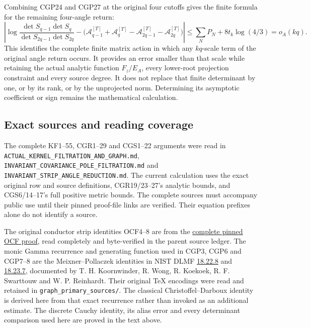 \documentclass[11pt]{article}
\begin{document}
Combining CGP24 and CGP27 at the original four cutoffs gives the finite formula for the remaining four-angle return: \[
\boxed{\left|
\log\frac{\det S_{q-1}\det S_q}{\det S_{2q-1}\det S_{2q}}
-\bigl(\mathcal A_{q-1}^{[T]}+\mathcal A_q^{[T]}
-\mathcal A_{2q-1}^{[T]}-\mathcal A_{2q}^{[T]}\bigr)
\right|
\le\sum_NP_N+8t_k\log(4/3)=o_A(kq).}
\tag{CGP28}
\] This identifies the complete finite matrix action in which any \(kq\)-scale term of the original angle return occurs. It provides an error smaller than that scale while retaining the actual analytic function \(F_z/E_A\), every lower-root projection constraint and every source degree. It does not replace that finite determinant by one, or by its rank, or by the unprojected norm. Determining its asymptotic coefficient or sign remains the mathematical calculation.

\subsection{Exact sources and reading coverage}\label{exact-sources-and-reading-coverage}

The complete KF1--55, CGR1--29 and CGS1--22 arguments were read in \nolinkurl{ACTUAL_KERNEL_FILTRATION_AND_GRAPH.md}, \nolinkurl{INVARIANT_COVARIANCE_POLE_FILTRATION.md} and \nolinkurl{INVARIANT_STRIP_ANGLE_REDUCTION.md}. The current calculation uses the exact original row and source definitions, CGR19/23--27's analytic bounds, and CGS6/14--17's full positive metric bounds. The complete sources must accompany public use until their pinned proof-file links are verified. Their equation prefixes alone do not identify a source.

The original conductor strip identities OCF4--8 are from the \href{https://github.com/KokunoYumeto/zeta-function-research-reader/blob/5992ad50c0f2a06921f1fcaded7b4e38097c0739/workbenches/splitzero-tandem/continuations/20260920-original-kernel-mixed-determinants/providers/ORIGINAL_CONDUCTOR_STRIP_FRAME.tex\#L27}{complete pinned OCF proof}, read completely and byte-verified in the parent source ledger. The monic Gamma recurrence and generating function used in CGP3, CGP6 and CGP7--8 are the Meixner--Pollaczek identities in NIST DLMF \href{https://dlmf.nist.gov/18.22.E8}{18.22.8} and \href{https://dlmf.nist.gov/18.23.E7}{18.23.7}, documented by T. H. Koornwinder, R. Wong, R. Koekoek, R. F. Swarttouw and W. P. Reinhardt. Their original TeX encodings were read and retained in \nolinkurl{graph_primary_sources/}. The classical Christoffel--Darboux identity is derived here from that exact recurrence rather than invoked as an additional estimate. The discrete Cauchy identity, its alias error and every determinant comparison used here are proved in the text above.
\end{document}
